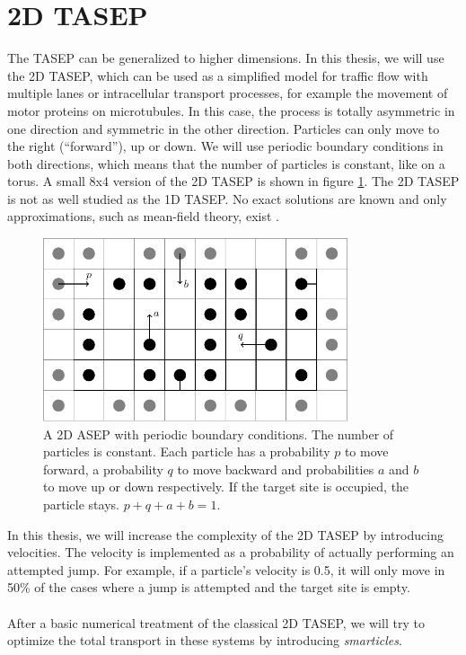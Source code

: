 \section{2D TASEP}
\label{sec:2d-tasep}
The TASEP can be generalized to higher dimensions. In this thesis, we will use the 2D TASEP, which can be used as a simplified model for traffic flow with multiple lanes or intracellular transport processes, for example the movement of motor proteins on microtubules. In this case, the process is totally asymmetric in one direction and symmetric in the other direction. Particles can only move to the right (\enquote{forward}), up or down. We will use periodic boundary conditions in both directions, which means that the number of particles is constant, like on a torus. A small 8x4 version of the 2D TASEP is shown in figure \ref{fig:tasep_2d}. The 2D TASEP is not as well studied as the 1D TASEP. No exact solutions are known and only approximations, such as mean-field theory, exist \cite{goykolov_asymmetric_2007}.
\\
\begin{figure}[h]
    \centering
    \includegraphics[width=0.8\textwidth]{tasep_2d.pdf}
    \caption{A 2D ASEP with periodic boundary conditions. The number of particles is constant. Each particle has a probability $p$ to move forward, a probability $q$ to move backward and probabilities $a$ and $b$ to move up or down respectively. If the target site is occupied, the particle stays. $p+q+a+b=1$.}
    \label{fig:tasep_2d}
\end{figure}
In this thesis, we will increase the complexity of the 2D TASEP by introducing velocities. The velocity is implemented as a probability of actually performing an attempted jump. For example, if a particle's velocity is 0.5, it will only move in 50\% of the cases where a jump is attempted and the target site is empty. 
\\
\\
After a basic numerical treatment of the classical 2D TASEP, we will try to optimize the total transport in these systems by introducing \textit{smarticles}. 

